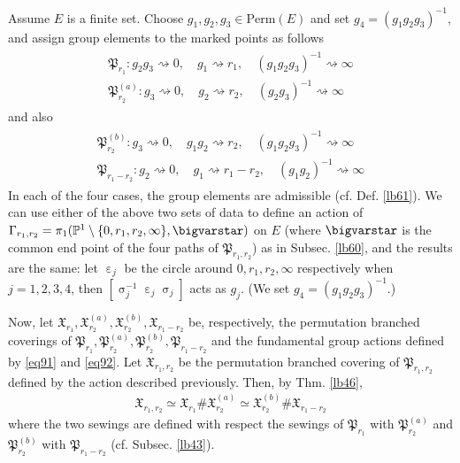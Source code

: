 \documentclass[11pt,b5paper,notitlepage]{article}
\theoremstyle{definition}
\theoremstyle{plain}
\newcommand{\fk}{\mathfrak}
\newcommand{\Pbb}{\mathbb P}
\newcommand{\Perm}{\mathrm{Perm}}
\numberwithin{equation}{subsection}
\begin{document}
Assume $E$ is a finite set.  Choose $g_1,g_2,g_3\in\Perm(E)$ and set $g_4=(g_1g_2g_3)^{-1}$, and assign group elements to the marked points as follows
\begin{gather}\label{eq91}
\begin{array}{c}
\fk P_{r_1}: g_2g_3\rightsquigarrow 0,\quad g_1\rightsquigarrow	r_1,\quad (g_1g_2g_3)^{-1}\rightsquigarrow \infty\\[0.7ex]
\fk P_{r_2}^{(a)}: g_3\rightsquigarrow 0,\quad g_2\rightsquigarrow	r_2,\quad (g_2g_3)^{-1}\rightsquigarrow \infty
\end{array}
\end{gather}
and also
\begin{gather}\label{eq92}
\begin{array}{c}
\fk P_{r_2}^{(b)}: g_3\rightsquigarrow 0,\quad g_1g_2\rightsquigarrow	r_2,\quad (g_1g_2g_3)^{-1}\rightsquigarrow \infty\\[0.7ex]
\fk P_{r_1-r_2}: g_2\rightsquigarrow 0,\quad g_1\rightsquigarrow	r_1-r_2,\quad (g_1g_2)^{-1}\rightsquigarrow \infty
\end{array}
\end{gather}
In each of the four cases, the group elements are admissible (cf. Def. \ref{lb61}). We can use either of the  above two sets of data to define an action of $\Gamma_{r_1,r_2}=\pi_1(\Pbb^1\setminus\{0,r_1,r_2,\infty\},\bigvarstar)$ on $E$ (where $\bigvarstar$ is the common end point of the four paths of $\fk P_{r_1,r_2}$) as in Subsec. \ref{lb60}, and the results are the same: let $\upepsilon_j$ be the circle around $0,r_1,r_2,\infty$ respectively when $j=1,2,3,4$, then $[\upsigma_j^{-1}\upepsilon_j\upsigma_j]$ acts as $g_j$. (We set $g_4=(g_1g_2g_3)^{-1}$.)

Now, let $\fk X_{r_1},\fk X_{r_2}^{(a)},\fk X_{r_2}^{(b)},\fk X_{r_1-r_2}$ be, respectively, the permutation branched coverings of $\fk P_{r_1},\fk P_{r_2}^{(a)},\fk P_{r_2}^{(b)},\fk P_{r_1-r_2}$ and the fundamental group actions defined by \eqref{eq91} and \eqref{eq92}. Let $\fk X_{r_1,r_2}$ be the permutation branched covering of $\fk P_{r_1,r_2}$ defined by the action described previously. Then, by Thm. \ref{lb46}, 
\begin{align}
\fk X_{r_1,r_2}\simeq \fk X_{r_1}\#\fk X_{r_2}^{(a)}\simeq \fk X_{r_2}^{(b)}\#\fk X_{r_1-r_2}	\label{eq99}
\end{align}
where the two sewings are defined with respect the sewings of $\fk P_{r_1}$ with $\fk P_{r_2}^{(a)}$ and $\fk P_{r_2}^{(b)}$ with $\fk P_{r_1-r_2}$ (cf. Subsec. \ref{lb43}).
\end{document}
